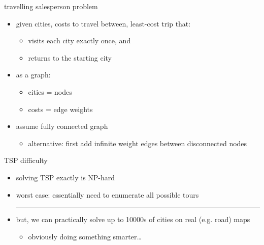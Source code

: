 \begin{frame}{travelling salesperson problem}
\begin{itemize}
\item given cities, costs to travel between, least-cost trip that:
\begin{itemize}
\item visits each city exactly once, and
\item returns to the starting city
\end{itemize}
\item as a graph:
\begin{itemize}
\item cities = nodes
\item costs = edge weights
\end{itemize}
\item assume fully connected graph
\begin{itemize}
\item alternative: first add infinite weight edges between disconnected nodes
\end{itemize}
\end{itemize}
\end{frame}

\begin{frame}{TSP difficulty}
\begin{itemize}
\item solving TSP exactly is NP-hard
\vspace{.5cm}
\item worst case: essentially need to enumerate all possible tours
\hrule
\item but, we can practically solve up to 10000s of cities on real (e.g. road) maps
\begin{itemize}
\item obviously doing something smarter\ldots
\end{itemize}
\end{itemize}
\end{frame}
